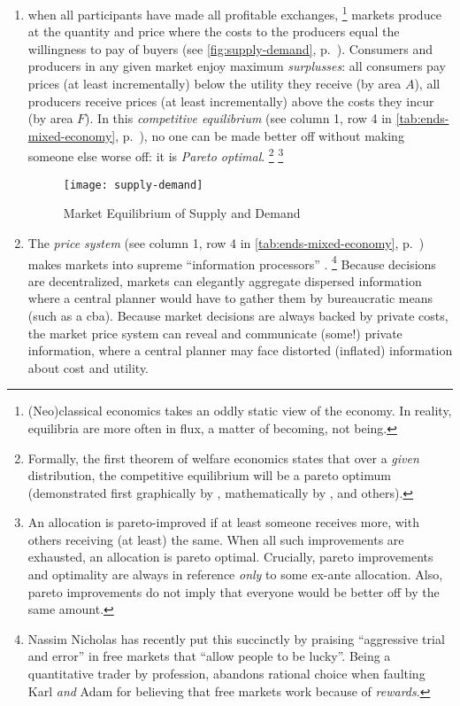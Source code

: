 \begin{enumerate}
	\item when all  participants have made all profitable exchanges,
	\footnote{
		(Neo)classical economics takes an oddly static view of the economy.
		In reality, equilibria are more often in flux, a matter of becoming, not being.
	}
	markets produce at the quantity and price where the costs to the producers equal the willingness to pay of buyers (see \autoref{fig:supply-demand}, p.~\pageref{fig:supply-demand}).
	Consumers and producers in any given market enjoy maximum \emph{surplusses}:
	all consumers pay prices (at least incrementally) below the utility they receive (by area $A$), all producers receive prices (at least incrementally) above the costs they incur (by area $F$).
	In this \emph{competitive equilibrium} (see column 1, row 4 in \autoref{tab:ends-mixed-economy}, p.~\pageref{tab:ends-mixed-economy}), no one can be made better off without making someone else worse off:
	it is \emph{Pareto optimal}.
	\footnote{\label{fn:1st-theorem}
		Formally, the first theorem of welfare economics states that over a \emph{given} distribution, the competitive equilibrium will be a pareto optimum (demonstrated first graphically by \cite{Lerner1944}, mathematically by \cite{Lange1934}, \cite{Debreu1954} and others).
	}
	\footnote{
		An allocation is pareto-improved if at least someone receives more, with others receiving (at least) the same.
		When all such improvements are exhausted, an allocation is pareto optimal.
		Crucially, pareto improvements and optimality are always in reference \emph{only} to some ex-ante allocation.
		Also, pareto improvements do not imply that everyone would be better off by the same amount.
	}
	\begin{figure}[htbp]
		\centering
		\texttt{[image: supply-demand]}
		\caption{Market Equilibrium of Supply and Demand}
		\label{fig:supply-demand}
	\end{figure}

	\item The \emph{price system} (see column 1, row 4 in \autoref{tab:ends-mixed-economy}, p.~\pageref{tab:ends-mixed-economy}) makes markets into supreme ``information processors'' \citep{Hayek1931}.
	\footnote{
		Nassim Nicholas \citeauthor{Taleb2007} has recently put this succinctly by praising ``aggressive trial and error'' \citeyearpar[xxi]{Taleb2007} in free markets that ``allow people to be lucky''.
		Being a quantitative trader by profession, \citeauthor{Taleb2007} abandons rational choice when faulting Karl \citeauthor{Marx-1867-aa} \emph{and} Adam \citeauthor{Smith-1776-lq} for believing that free markets work because of \emph{rewards}.
	}
	Because decisions are decentralized, markets can elegantly aggregate dispersed information where a central planner would have to gather them by bureaucratic means (such as a \gls{cba}).
	Because market decisions are always backed by private costs, the market price system can reveal and communicate (some!) private information, where a central planner may face distorted (inflated) information about cost and utility.
\end{enumerate}

